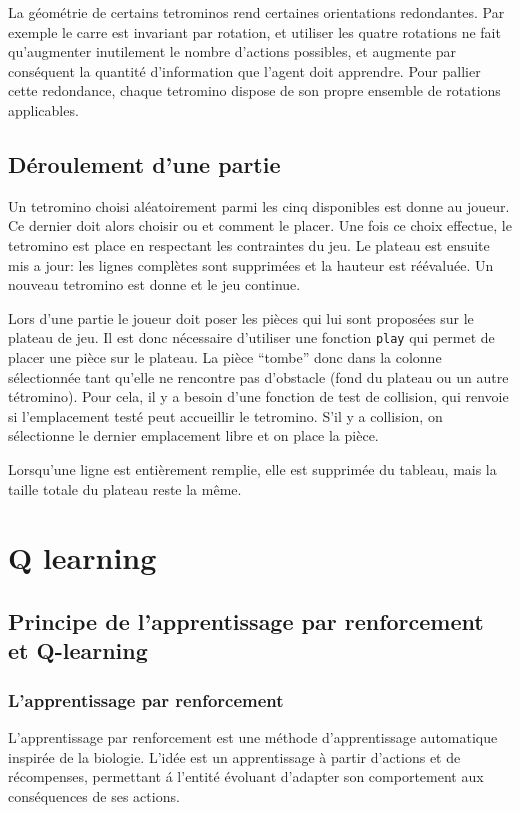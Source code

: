 \documentclass{report}
\begin{document}
La géométrie de certains tetrominos rend certaines orientations redondantes. Par
exemple le carre est invariant par rotation, et utiliser les quatre rotations
ne fait qu'augmenter inutilement le nombre d'actions possibles, et augmente par
conséquent la quantité d'information que l'agent doit apprendre. Pour pallier
cette redondance, chaque tetromino dispose de son propre ensemble de rotations
applicables.

\section{Déroulement d'une partie}
Un tetromino choisi aléatoirement parmi les cinq disponibles est donne au
joueur. Ce dernier doit alors choisir ou et comment le placer. Une fois ce
choix effectue, le tetromino est place en respectant les contraintes du jeu. Le
plateau est ensuite mis a jour: les lignes complètes sont supprimées et la
hauteur est réévaluée. Un nouveau tetromino est donne et le jeu continue.


Lors d'une partie le joueur doit poser les pièces qui lui sont proposées sur
le plateau de jeu. Il est donc nécessaire d'utiliser une fonction \texttt{play}
qui permet de placer une pièce sur le plateau. La pièce ``tombe'' donc dans la
colonne sélectionnée tant qu'elle ne rencontre pas d'obstacle (fond du plateau
ou un autre tétromino). Pour cela, il y a besoin d'une fonction de test de
collision, qui renvoie si l'emplacement testé peut accueillir le tetromino.
S'il y a collision, on sélectionne le dernier emplacement libre et on place la
pièce.

Lorsqu'une ligne est entièrement remplie, elle est supprimée du tableau, mais
la taille totale du plateau reste la même.


\chapter{Q learning}

\section{Principe de l'apprentissage par renforcement et Q-learning}
\subsection{L'apprentissage par renforcement}

L'apprentissage par renforcement est une méthode d'apprentissage automatique
inspirée de la biologie. L'idée est un apprentissage à partir d'actions et
de récompenses, permettant \'a l'entité évoluant d'adapter son comportement aux
conséquences de ses actions.
\end{document}

